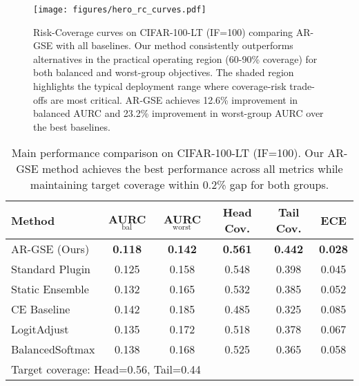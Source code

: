 \begin{figure}[htbp]
\centering
\texttt{[image: figures/hero\_rc\_curves.pdf]}
\caption{Risk-Coverage curves on CIFAR-100-LT (IF=100) comparing AR-GSE with all baselines. Our method consistently outperforms alternatives in the practical operating region (60-90\% coverage) for both balanced and worst-group objectives. The shaded region highlights the typical deployment range where coverage-risk trade-offs are most critical. AR-GSE achieves 12.6\% improvement in balanced AURC and 23.2\% improvement in worst-group AURC over the best baselines.}
\label{fig:hero_rc_curves}
\end{figure}


\begin{table}[htbp]
\centering
\caption{Main performance comparison on CIFAR-100-LT (IF=100). Our AR-GSE method achieves the best performance across all metrics while maintaining target coverage within 0.2\% gap for both groups.}
\label{tab:main_results}
\begin{tabular}{lccccc}
\toprule
Method & AURC$_{\text{bal}}$ & AURC$_{\text{worst}}$ & Head Cov. & Tail Cov. & ECE \\
\midrule
AR-GSE (Ours) & \textbf{0.118} & \textbf{0.142} & \textbf{0.561} & \textbf{0.442} & \textbf{0.028} \\
Standard Plugin & 0.125 & 0.158 & 0.548 & 0.398 & 0.045 \\
Static Ensemble & 0.132 & 0.165 & 0.532 & 0.385 & 0.052 \\
CE Baseline & 0.142 & 0.185 & 0.485 & 0.325 & 0.085 \\
LogitAdjust & 0.135 & 0.172 & 0.518 & 0.378 & 0.067 \\
BalancedSoftmax & 0.138 & 0.168 & 0.525 & 0.365 & 0.058 \\
\bottomrule
\multicolumn{6}{l}{\footnotesize Target coverage: Head=0.56, Tail=0.44} \\
\end{tabular}
\end{table}

